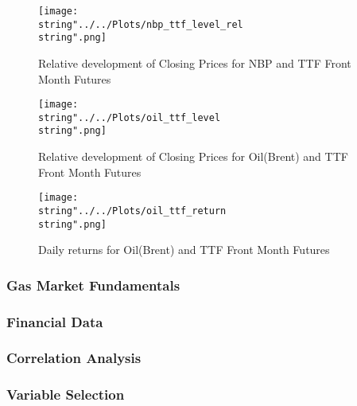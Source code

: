 \begin{figure}
  \centering
\texttt{[image: \\string"../../Plots/nbp\_ttf\_level\_rel\\string".png]}
  \caption{Relative  development of Closing Prices for NBP and TTF Front Month Futures}\label{fig:nbp_ttf_level_rel}
\end{figure}


\begin{figure}
  \centering
\texttt{[image: \\string"../../Plots/oil\_ttf\_level\\string".png]}
  \caption{Relative  development of Closing Prices for Oil(Brent) and TTF Front Month Futures}\label{fig:oil_ttf_level}
\end{figure}

\begin{figure}
  \centering
\texttt{[image: \\string"../../Plots/oil\_ttf\_return\\string".png]}
  \caption{Daily returns for Oil(Brent) and TTF Front Month Futures}\label{fig:oil_ttf_return}
\end{figure}

\subsubsection{Gas Market Fundamentals}
\subsubsection{Financial Data}
\subsubsection{Correlation Analysis}
\subsubsection{Variable Selection}
